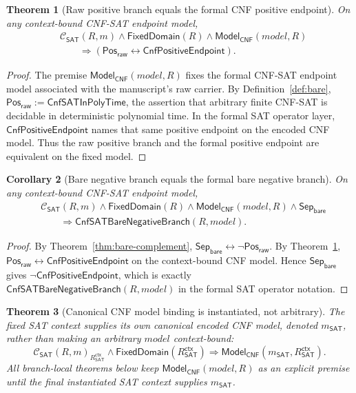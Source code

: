 \documentclass[11pt]{article}
\newtheorem{theorem}{Theorem}[section]
\newtheorem{corollary}[theorem]{Corollary}
\theoremstyle{definition}
\theoremstyle{remark}
\newcommand{\PosRaw}{\mathsf{Pos}_{\mathsf{raw}}}
\newcommand{\SepBare}{\mathsf{Sep}_{\mathsf{bare}}}
\newcommand{\CnfSATP}{\mathsf{CnfSATInPolyTime}}
\newcommand{\CnfBareNeg}{\mathsf{CnfSATBareNegativeBranch}}
\newcommand{\ClayCtx}{\mathcal{C}_{\mathsf{SAT}}(R,m)}
\newcommand{\RSATctx}{R_{\mathsf{SAT}}^{\mathsf{ctx}}}
\newcommand{\FixedDom}{\mathsf{FixedDomain}}
\newcommand{\CnfPositiveEndpoint}{\mathsf{CnfPositiveEndpoint}}
\newcommand{\ModelOfCnf}{\mathsf{Model}_{\mathsf{CNF}}}
\begin{document}
\begin{theorem}[Raw positive branch equals the formal CNF positive endpoint]\label{thm:raw-positive-formal-positive}
On any context-bound CNF-SAT endpoint model,
\[
\begin{aligned}
  &\ClayCtx\wedge\FixedDom(R)\wedge\ModelOfCnf(model,R)\\
  &\qquad\Rightarrow
  (\PosRaw\leftrightarrow\CnfPositiveEndpoint).
\end{aligned}
\]
\end{theorem}

\begin{proof}
The premise \(\ModelOfCnf(model,R)\) fixes the formal CNF-SAT endpoint model associated with the manuscript's raw carrier. By Definition~\ref{def:bare}, \(\PosRaw:=\CnfSATP\), the assertion that arbitrary finite CNF-SAT is decidable in deterministic polynomial time. In the formal SAT operator layer, \(\CnfPositiveEndpoint\) names that same positive endpoint on the encoded CNF model. Thus the raw positive branch and the formal positive endpoint are equivalent on the fixed model.
\end{proof}

\begin{corollary}[Bare negative branch equals the formal bare negative branch]\label{cor:bare-negative-formal}
On any context-bound CNF-SAT endpoint model,
\[
\begin{aligned}
  &\ClayCtx\wedge\FixedDom(R)\wedge\ModelOfCnf(model,R)\wedge\SepBare\\
  &\qquad\Rightarrow
  \CnfBareNeg(R,model).
\end{aligned}
\]
\end{corollary}

\begin{proof}
By Theorem~\ref{thm:bare-complement}, \(\SepBare\leftrightarrow\neg\PosRaw\). By Theorem~\ref{thm:raw-positive-formal-positive}, \(\PosRaw\leftrightarrow\CnfPositiveEndpoint\) on the context-bound CNF model. Hence \(\SepBare\) gives \(\neg\CnfPositiveEndpoint\), which is exactly \(\CnfBareNeg(R,model)\) in the formal SAT operator notation.
\end{proof}
\begin{theorem}[Canonical CNF model binding is instantiated, not arbitrary]\label{thm:canonical-cnf-model-binding}
The fixed SAT context supplies its own canonical encoded CNF model, denoted \(m_{\mathsf{SAT}}\), rather than making an arbitrary \(model\) context-bound:
\[
  \ClayCtx_{\RSATctx}\wedge\FixedDom(\RSATctx)\Rightarrow\ModelOfCnf(m_{\mathsf{SAT}},\RSATctx).
\]
All branch-local theorems below keep \(\ModelOfCnf(model,R)\) as an explicit premise until the final instantiated SAT context supplies \(m_{\mathsf{SAT}}\).
\end{theorem}
\end{document}
